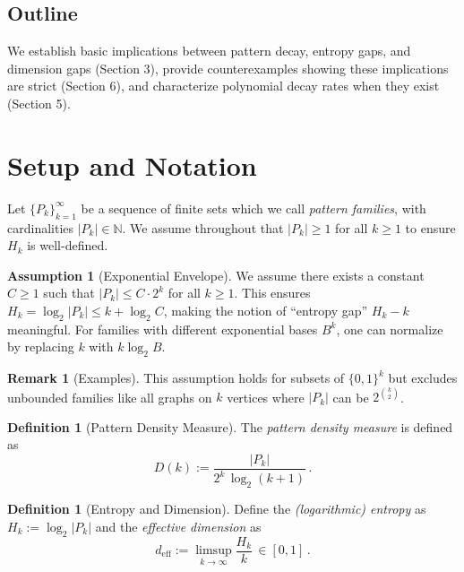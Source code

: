 \documentclass[11pt]{article}
\theoremstyle{definition}
\newtheorem{definition}[theorem]{Definition}
\newtheorem{remark}[theorem]{Remark}
\newtheorem{assumption}[theorem]{Assumption}
\newcommand{\bbN}{\mathbb{N}}
\begin{document}
\subsection{Outline}

We establish basic implications between pattern decay, entropy gaps, and dimension gaps (Section 3), provide counterexamples showing these implications are strict (Section 6), and characterize polynomial decay rates when they exist (Section 5).

\section{Setup and Notation}

Let $\{P_k\}_{k=1}^\infty$ be a sequence of finite sets which we call \emph{pattern families}, with cardinalities $|P_k|\in\bbN$. We assume throughout that $|P_k| \geq 1$ for all $k \geq 1$ to ensure $H_k$ is well-defined.

\begin{assumption}[Exponential Envelope]\label{ass:envelope}
We assume there exists a constant $C \geq 1$ such that $|P_k| \le C \cdot 2^k$ for all $k \geq 1$. This ensures $H_k = \log_2|P_k| \le k + \log_2 C$, making the notion of ``entropy gap'' $H_k - k$ meaningful. For families with different exponential bases $B^k$, one can normalize by replacing $k$ with $k\log_2 B$.
\end{assumption}

\begin{remark}[Examples]
This assumption holds for subsets of $\{0,1\}^k$ but excludes unbounded families like all graphs on $k$ vertices where $|P_k|$ can be $2^{\binom{k}{2}}$.
\end{remark} 

\begin{definition}[Pattern Density Measure]
The \emph{pattern density measure} is defined as
\begin{equation}
D(k):= \frac{|P_k|}{2^k\,\log_2(k+1)}\,.
\end{equation}
\end{definition}

\begin{definition}[Entropy and Dimension]
Define the \emph{(logarithmic) entropy} as $H_k:=\log_2|P_k|$ and the \emph{effective dimension} as
\begin{equation}
d_{\mathrm{eff}}:=\limsup_{k\to\infty} \frac{H_k}{k}\,\in[0,1]\,.
\end{equation}
\end{definition}
\end{document}
